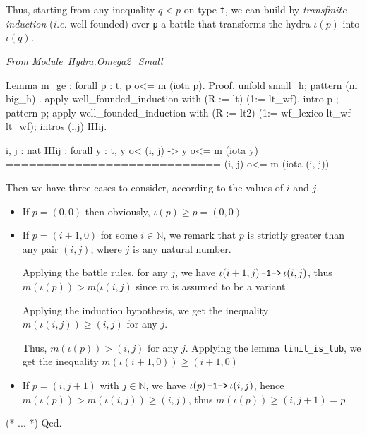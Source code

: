 \documentclass[a4paper]{book}
\begin{document}

Thus, starting from any inequality $q < p$ on type \texttt{t}, we can build 
by \emph{transfinite induction} (\emph{i.e.} well-founded) over \texttt{p} a battle 
that transforms the hydra $\iota(p)$ into $\iota(q)$.

\vspace{4pt}
\emph{From Module~\href{../src/html/hydras.Hydra.Omega2_Small.html\#m_ge}{Hydra.Omega2\_Small}}

\begin{Coqsrc}
Lemma m_ge : forall p : t,   p o<= m (iota p).
Proof.
  unfold small_h; pattern (m big_h) .   
   apply  well_founded_induction with (R := lt) (1:= lt_wf).
  intro p ; pattern p;
    apply  well_founded_induction with 
               (R := lt2) (1:= wf_lexico lt_wf lt_wf);
     intros (i,j) IHij. 
\end{Coqsrc}

\begin{Coqanswer}
  i, j : nat
  IHij : forall y : t, y o< (i, j) -> y o<= m (iota y)
  ============================
  (i, j) o<= m (iota (i, j)) 
\end{Coqanswer}


Then we have  three cases to consider, according to the values of $i$ and $j$.
\begin{itemize}
\item If $p=(0,0)$ then obviously, $\iota(p)\geq p = (0,0)$
\item If  $p=(i+1,0)$ for some $i\in\mathbb{N}$, we
 remark  that $p$ is strictly greater than any pair $ (i, j)$, where $j$ 
is any natural number.

Applying the battle rules, for any $j$, we have $\iota(i+1,j)  {\mbox{\,\texttt{-1->}\,}} \iota(i, j) $, thus $m(\iota(p)) > m(\iota(i,j)$ since  $m$ is assumed to be a variant.

Applying the induction hypothesis, we get the inequality
 $ m(\iota(i,j)) \geq (i,j)$ for any $j$. 

Thus, $m(\iota(p)) > (i,j)$ for any $j$.
Applying the lemma \texttt{limit\_is\_lub}, we get  the inequality
$m(\iota(i+1,0))\geq (i+1,0)$

\item If $p=(i,j+1)$ with $j\in\mathbb{N}$, we have  $\iota(p)  {\mbox{\,\texttt{-1->}\,}} \iota(i, j) $,
hence $m(\iota(p))> m(\iota(i,j)) \geq (i,j)$, thus $m(\iota(p))\geq (i,j+1)=p$

\end{itemize}

\begin{Coqsrc}
  (* ... *)
Qed.
\end{Coqsrc}
\end{document}
